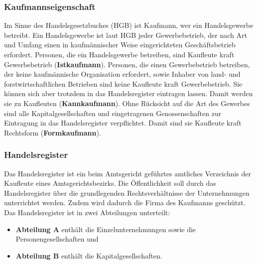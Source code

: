 \subsubsection{Kaufmannseigenschaft}
Im Sinne des Handelsgesetzbuches (HGB) ist Kaufmann, wer ein Handelsgewerbe betreibt. Ein Handelsgewerbe ist laut HGB jeder Gewerbebetrieb, der nach Art und Umfang einen in kaufmännischer Weise eingerichteten Geschäftsbetrieb erfordert. Personen, die ein Handelsgewerbe betreiben, sind Kaufleute kraft Gewerbebetrieb ({\bf Istkaufmann}). Personen, die einen Gewerbebetrieb betreiben, der keine kaufmännische Organisation erfordert, sowie Inhaber von land- und forstwirtschaftlichen Betrieben sind keine Kaufleute kraft Gewerbebetrieb. Sie können sich aber trotzdem in das Handelsregister eintragen lassen. Damit werden sie zu Kaufleuten ({\bf Kannkaufmann}). Ohne Rücksicht auf die Art des Gewerbes sind alle Kapitalgesellschaften und eingetragenen Genossenschaften zur Eintragung in das Handelsregister verpflichtet. Damit sind sie Kaufleute kraft Rechtsform ({\bf Formkaufmann}).

\subsubsection{Handelsregister}
Das Handelsregister ist ein beim Amtsgericht geführtes amtliches Verzeichnis der Kaufleute eines Amtsgerichtsbezirks. Die Öffentlichkeit soll durch das Handelsregister über die grundlegenden Rechtsverhältnisse der Unternehmungen unterrichtet werden. Zudem wird dadurch die Firma des Kaufmanns geschützt. Das Handelsregister ist in zwei Abteilungen unterteilt:
\begin{itemize}
\setlength\itemsep{0em}
	\item {\bf Abteilung A} enthält die Einzelunternehmungen sowie die Personengesellschaften und
	\item {\bf Abteilung B} enthält die Kapitalgesellschaften.
\end{itemize}

